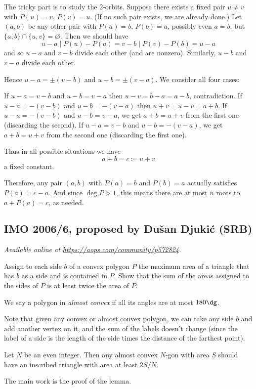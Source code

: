\documentclass[11pt]{scrartcl}
\begin{document}
The tricky part is to study the $2$-orbits.
Suppose there exists a fixed pair $u \neq v$
with $P(u) = v$, $P(v) = u$.
(If no such pair exists, we are already done.)
Let $(a,b)$ be any other pair with $P(a) = b$, $P(b) = a$,
possibly even $a = b$, but $\{a,b\} \cap \{u,v\} = \varnothing$.
Then we should have
\[ u-a \mid P(u)-P(a) = v-b
  \mid P(v) - P(b) = u-a \]
and so $u-a$ and $v-b$ divide each other (and are nonzero).
Similarly, $u-b$ and $v-a$ divide each other.

Hence $u-a = \pm (v-b)$ and $u-b = \pm (v-a)$.
We consider all four cases:
\begin{itemize}
  \ii If $u-a = v-b$ and $u-b = v-a$
  then $u-v = b-a = a-b$, contradiction.
  \ii If $u-a = -(v-b)$ and $u-b = -(v-a)$
  then $u+v = u-v = a+b$.
  \ii If $u-a = -(v-b)$ and $u-b = v-a$,
  we get $a+b = u+v$ from the first one
  (discarding the second).
  \ii If $u-a = v-b$ and $u-b = -(v-a)$,
  we get $a+b = u+v$ from the second one
  (discarding the first one).
\end{itemize}
Thus in all possible situations we have
\[ a+b = c \coloneqq u+v \]
a fixed constant.

Therefore, any pair $(a,b)$ with $P(a) = b$
and $P(b) = a$ actually satisfies $P(a) = c-a$.
And since $\deg P > 1$,
this means there are at most $n$ roots to $a+P(a)=c$, as needed.
\pagebreak

\subsection{IMO 2006/6, proposed by Dušan Djukić (SRB)}
\textsl{Available online at \url{https://aops.com/community/p572824}.}
\begin{mdframed}[style=mdpurplebox,frametitle={Problem statement}]
Assign to each side $b$ of a convex polygon $P$
the maximum area of a triangle that has $b$ as a side and is contained in $P$.
Show that the sum of the areas assigned to the sides of $P$ is at least twice the area of $P$.
\end{mdframed}
We say a polygon in \emph{almost convex}
if all its angles are at most $180\dg$.

Note that given any convex or almost convex polygon,
we can take any side $b$ and add another vertex on it, and the sum of the labels doesn't change
(since the label of a side is the length of the side times the distance of the farthest point).

\begin{lemma*}
  Let $N$ be an even integer.
  Then any almost convex $N$-gon with area $S$
  should have an inscribed triangle with area at least $2S/N$.
\end{lemma*}
The main work is the proof of the lemma.
\end{document}

